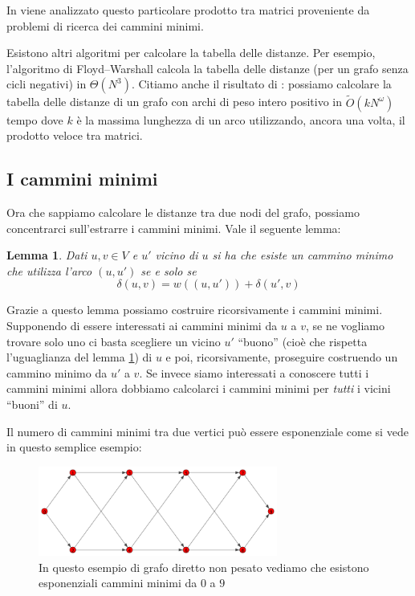 \documentclass[a4paper,10pt]{amsbook}
\newcounter{counter1}
\theoremstyle{plain}
\newtheorem{mylem}[counter1]{Lemma}
\theoremstyle{definition}
\theoremstyle{remark}
\newcommand{\pa}[1]{\left(#1\right)}
\begin{document}
In \cite{funnymult} viene analizzato questo particolare prodotto tra
matrici proveniente da problemi di ricerca dei cammini minimi.


Esistono altri algoritmi per calcolare la tabella delle distanze. Per
esempio, l'algoritmo di Floyd–Warshall calcola la tabella delle
distanze (per un grafo senza cicli negativi) in $\Theta\pa{ N^3}$.
Citiamo anche il risultato di \cite{apspfmp}: possiamo calcolare la
tabella delle distanze di un grafo con archi di peso intero positivo
in $\tilde O\pa{ kN^\omega}$ tempo dove $k$ è la massima lunghezza di
un arco utilizzando, ancora una volta, il prodotto veloce tra matrici.

\subsection{I cammini minimi}

Ora che sappiamo calcolare le distanze tra due nodi del grafo,
possiamo concentrarci sull'estrarre i cammini minimi. Vale il seguente
lemma:
\begin{mylem}
  \label{lem:vicinibuoni}
  Dati $u,v \in V$ e $u'$ vicino di $u$ si ha che esiste un cammino
  minimo che utilizza l'arco $(u,u')$ se e solo se
  \[ \delta \pa{ u,v} = w\pa{ (u,u') } + \delta \pa{ u',v} \]
\end{mylem}

Grazie a questo lemma possiamo costruire ricorsivamente i cammini
minimi. Supponendo di essere interessati ai cammini minimi da $u$ a
$v$, se ne vogliamo trovare solo uno ci basta scegliere un vicino $u'$
``buono'' (cioè che rispetta l'uguaglianza del lemma
\ref{lem:vicinibuoni}) di $u$ e poi, ricorsivamente, proseguire
costruendo un cammino minimo da $u'$ a $v$. Se invece siamo
interessati a conoscere tutti i cammini minimi allora dobbiamo
calcolarci i cammini minimi per \emph{tutti} i vicini ``buoni'' di
$u$.

Il numero di cammini minimi tra due vertici può essere esponenziale
come si vede in questo semplice esempio:

\begin{figure}[H]
  \centering
  \includegraphics[width=0.7\textwidth]{diamantecatena}
  \caption{In questo esempio di grafo diretto non pesato vediamo che
    esistono esponenziali cammini minimi da $0$ a $9$}
  \label{fig:diamantecatena}
\end{figure}
\end{document}
